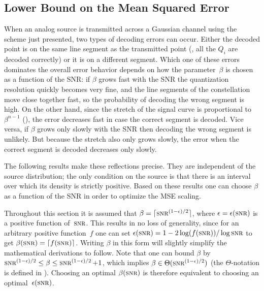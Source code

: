 \subsection{Lower Bound on the Mean Squared Error}\label{sec:scalarlowerbound}

When an analog source is transmitted across a Gaussian channel using the scheme
just presented, two types of decoding errors can occur. Either the decoded point
is on the same line segment as the transmitted point (\ie, all the $Q_i$ are
decoded correctly) or it is on a different segment. Which one of these errors
dominates the overall error behavior depends on how the parameter~$\beta$ is
chosen as a function of the SNR: if $\beta$ grows fast with the SNR the
quantization resolution quickly becomes very fine, and the line segments of the
constellation move close together fast, so the probability of decoding the wrong
segment is high. On the other hand, since the stretch of the signal curve is
proportional to~$\beta^{n-1}$ (), the error decreases fast in
case the correct segment is decoded. Vice versa, if $\beta$ grows only slowly
with the SNR then decoding the wrong segment is unlikely. But because the
stretch also only grows slowly, the error when the correct segment is decoded
decreases only slowly.

The following results make these reflections precise. They are independent of
the source distribution; the only condition on the source is that there is an
interval over which its density is strictly positive. Based on these results one
can choose $\beta$ as a function of the SNR in order to optimize the MSE
scaling. 

\begin{remark}
  \label{rem:betaepswlog}
  Throughout this section it is assumed that $\beta = \lceil
  \snr^{(1-\e)/2}\rceil$, where $\e = \e(\snr)$ is a positive function
  of~$\snr$. This results in no loss of generality, since for an arbitrary
  positive function~$f$ one can set $\e(\snr) = 1-2 \log(f(\snr))/\log\snr$ to
  get $\beta(\snr) = \lceil f(\snr) \rceil$.  Writing $\beta$ in this form will
  slightly simplify the mathematical derivations to follow. Note that one can
  bound $\beta$ by $\snr^{(1-\e)/2} \le \beta \le \snr^{(1-\e)/2} + 1$, which
  implies $\beta \in \Theta(\snr^{(1-\e)/2})$ (the $\Theta$-notation is defined
  in ). Choosing an optimal $\beta(\snr)$ is therefore
  equivalent to choosing an optimal~$\e(\snr)$.
\end{remark}

